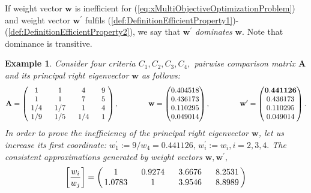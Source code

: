 \documentclass{article}
\theoremstyle{plain}
\newtheorem{example}{Example}[section]
\begin{document}
If weight vector $\mathbf{w}$ is inef{\kern0pt}f{\kern0pt}icient for  (\ref{eq:xMultiObjectiveOptimizationProblem}) and
weight vector $\mathbf{w^{\prime}}$ fulf{\kern0pt}ils (\ref{def:DefinitionEfficientProperty1})-(\ref{def:DefinitionEfficientProperty2}),
we say that $\mathbf{w^{\prime}}$ \emph{dominates} $\mathbf{w}$. Note that dominance is transitive.


\begin{example}  \label{example:0a}
Consider four criteria $C_1, C_2, C_3, C_4,$ pairwise comparison matrix $\mathbf{A}$ and its principal right
eigenvector $\mathbf{w}$ as follows:
\[
\mathbf{A} =
\begin{pmatrix}
$\,\,$   1  $\,\,$   & $\,\,$    1  $\,\,$   & $\,\,$    4   $\,\,$ & $\,\,$    9   $\,\,$     \\
$\,\,$   1  $\,\,$   & $\,\,$    1  $\,\,$   & $\,\,$    7   $\,\,$ & $\,\,$    5   $\,\,$     \\
$\,\,$  1/4 $\,\,$   & $\,\,$   1/7 $\,\,$   & $\,\,$    1   $\,\,$ & $\,\,$    4   $\,\,$     \\
$\,\,$  1/9 $\,\,$   & $\,\,$   1/5 $\,\,$   & $\,\,$   1/4  $\,\,$ & $\,\,$    1   $\,\,$
\end{pmatrix},
\qquad \qquad {\mathbf{w}} =
\begin{pmatrix}
0.404518  \\
0.436173 \\
0.110295  \\
0.049014
\end{pmatrix},
\qquad \qquad {\mathbf{w}^{\prime}} =
\begin{pmatrix}
\mathbf{0.441126}  \\
0.436173 \\
0.110295  \\
0.049014
\end{pmatrix}.
\]
In order to prove the inef{\kern0pt}f{\kern0pt}iciency of the
principal right eigenvector $\mathbf{w}$, let us increase its f{\kern0pt}irst
coordinate: ${w}^{\prime}_1 := 9/{w}_4 = 0.441126, \,
{w}^{\prime}_i := {w}_i, i =2,3,4.$ The consistent approximations generated
by weight vectors ${\mathbf{w}}, {\mathbf{w}}^{\prime},$
\[
\left[ \frac{{w}_i}{{w}_j} \right] =
\begin{pmatrix}
$\,$   1    $\,\,$ & $\,\,$ 0.9274 $\,\,$ & $\,\,$ 3.6676 $\,\,$ & $\,\,$ 8.2531 $\,$    \\
$\,$ 1.0783 $\,\,$ & $\,\,$   1    $\,\,$ & $\,\,$ 3.9546 $\,\,$ & $\,\,$ 8.8989 $\,$    \\

\end{pmatrix}\]
\end{example}
\end{document}

